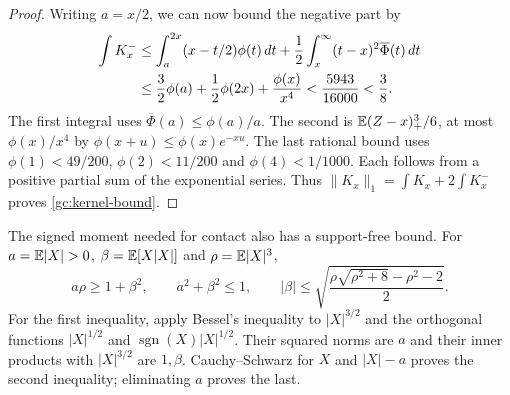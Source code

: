 \begin{proof}
Writing $a=x/2$, we can now bound the negative part by
\begin{align}\label{gc:negative-part}
 \int K_x^-&\le\int_a^{2x}(x-t/2)\phi(t)\,dt
       +\frac12\int_x^\infty(t-x)^2\overline\Phi(t)\,dt\notag\\
 &\le\frac32\phi(a)+\frac12\phi(2x)+\frac{\phi(x)}{x^4}
 <\frac{5943}{16000}<\frac38.
\end{align}
The first integral uses $\overline\Phi(a)\le\phi(a)/a$.
The second is $\mathbb E(Z-x)_+^3/6$, at most $\phi(x)/x^4$ by
$\phi(x+u)\le\phi(x)e^{-xu}$. The last rational bound uses
$\phi(1)<49/200$, $\phi(2)<11/200$ and $\phi(4)<1/1000$.
Each follows from a positive partial sum of the exponential series.
Thus $\|K_x\|_1=\int K_x+2\int K_x^-$ proves
\eqref{gc:kernel-bound}.

\end{proof}

The signed moment needed for contact also has a support-free bound.
For $a=\E|X|>0$, $\beta=\mathbb E[X|X|]$ and $\rho=\mathbb E|X|^3$,
\begin{equation}\label{ut:initial-signed-moment}
 a\rho\ge1+\beta^2,\qquad a^2+\beta^2\le1,\qquad
 |\beta|\le\sqrt{\frac{\rho\sqrt{\rho^2+8}-\rho^2-2}{2}}.
\end{equation}
For the first inequality, apply Bessel's inequality to $|X|^{3/2}$
and the orthogonal functions $|X|^{1/2}$ and
$\operatorname{sgn}(X)|X|^{1/2}$. Their squared norms are $a$ and
their inner products with $|X|^{3/2}$ are $1,\beta$.
Cauchy--Schwarz for $X$ and $|X|-a$ proves the second inequality;
eliminating $a$ proves the last.

